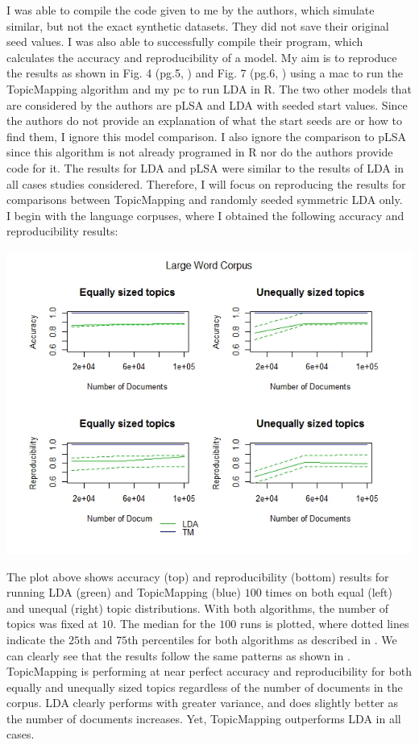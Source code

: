 \documentclass[12pt]{article}
\begin{document}
\noindent I was able to compile the code given to me by the authors, which simulate similar, but not the exact synthetic datasets. They did not save their original seed values. I was also able to successfully compile their program, which calculates the accuracy and reproducibility of a model. My aim is to reproduce the results as shown in Fig. 4 (pg.5, \cite{main}) and Fig. 7 (pg.6, \cite{main}) using a mac to run the TopicMapping algorithm and my pc to run LDA in R. The two other models that are considered by the authors are pLSA and LDA with seeded start values. Since the authors do not provide an explanation of what the start seeds are or how to find them, I ignore this model comparison. I also ignore the comparison to pLSA since this algorithm is not already programed in R nor do the authors provide code for it. The results for LDA and pLSA were similar to the results of LDA in all cases studies considered. Therefore, I will focus on reproducing the results for comparisons between TopicMapping and randomly seeded symmetric LDA only.
\\

\noindent I begin with the language corpuses, where I obtained the following accuracy and reproducibility results:
\vspace{2mm}
\begin{center}
	\includegraphics[scale=0.8]{Images/plot_largeC.jpeg}
\end{center} 
\vspace{2mm}
\noindent The plot above shows accuracy (top) and reproducibility (bottom) results for running LDA (green) and TopicMapping (blue) $100$ times on both equal (left) and unequal (right) topic distributions. With both algorithms, the number of topics was fixed at $10$. The median for the $100$ runs is plotted, where dotted lines indicate the $25$th and $75$th percentiles for both algorithms as described in \cite{main}. We can clearly see that the results follow the same patterns as shown in \cite{main}. TopicMapping is performing at near perfect accuracy and reproducibility for both equally and unequally sized topics regardless of the number of documents in the corpus. LDA clearly performs with greater variance, and does slightly better as the number of documents increases. Yet, TopicMapping outperforms LDA in all cases.
\\
\end{document}
